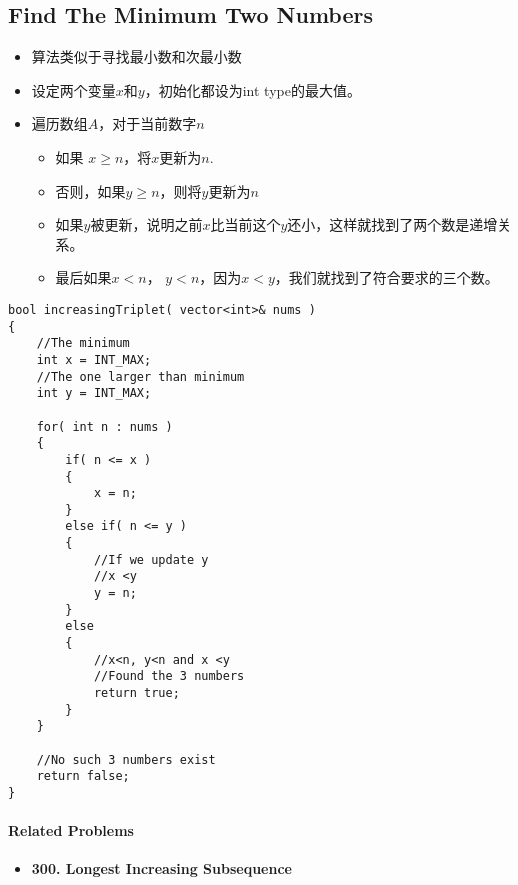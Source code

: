 \subsection{Find The Minimum Two Numbers}
\begin{itemize}
\item 算法类似于寻找最小数和次最小数
\item 设定两个变量$ x $和$ y $，初始化都设为int type的最大值。
\item 遍历数组$A$，对于当前数字$ n $
\begin{itemize}
\item 如果 $ x\geq n $，将$ x $更新为$n$. 
\item 否则，如果$ y\geq n $，则将$ y $更新为$n$
\item 如果$y$被更新，说明之前$x$比当前这个$y$还小，这样就找到了两个数是递增关系。
\item 最后如果$x<n$， $y<n$，因为$x<y$，我们就找到了符合要求的三个数。
\end{itemize}
\end{itemize}
\setcounter{lstlisting}{0}
\begin{lstlisting}[style=customc, caption={Find Minimum}]
bool increasingTriplet( vector<int>& nums )
{
    //The minimum
    int x = INT_MAX;
    //The one larger than minimum
    int y = INT_MAX;

    for( int n : nums )
    {
        if( n <= x )
        {
            x = n;
        }
        else if( n <= y )
        {
            //If we update y
            //x <y
            y = n;
        }
        else
        {
            //x<n, y<n and x <y
            //Found the 3 numbers
            return true;
        }
    }

    //No such 3 numbers exist
    return false;
}
\end{lstlisting}

\paragraph{Related Problems}
\begin{itemize}
\item \textbf{300. Longest Increasing Subsequence}
\end{itemize}

